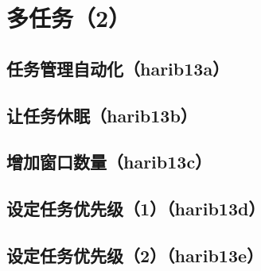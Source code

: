 ﻿\chapter{	多任务（2）	}
\section{	任务管理自动化（harib13a）	}
\section{	让任务休眠（harib13b）	}
\section{	增加窗口数量（harib13c）	}
\section{	设定任务优先级（1）（harib13d）	}
\section{	设定任务优先级（2）（harib13e）	}

